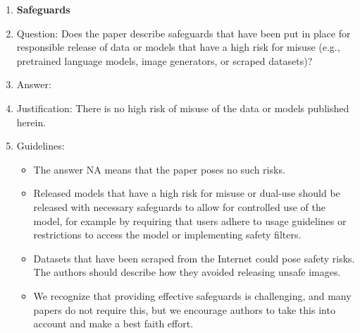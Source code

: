 \documentclass{article}
\begin{document}
\begin{enumerate}
\item {\bf Safeguards}
    \item[] Question: Does the paper describe safeguards that have been put in place for responsible release of data or models that have a high risk for misuse (e.g., pretrained language models, image generators, or scraped datasets)?
    \item[] Answer: \answerNA{} %
    \item[] Justification: There is no high risk of misuse of the data or models published herein.
    \item[] Guidelines:
    \begin{itemize}
        \item The answer NA means that the paper poses no such risks.
        \item Released models that have a high risk for misuse or dual-use should be released with necessary safeguards to allow for controlled use of the model, for example by requiring that users adhere to usage guidelines or restrictions to access the model or implementing safety filters. 
        \item Datasets that have been scraped from the Internet could pose safety risks. The authors should describe how they avoided releasing unsafe images.
        \item We recognize that providing effective safeguards is challenging, and many papers do not require this, but we encourage authors to take this into account and make a best faith effort.
    \end{itemize}


\end{enumerate}
\end{document}
